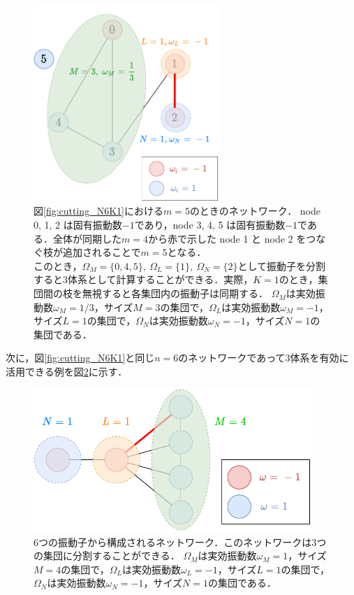 \documentclass[../main]{subfiles}
\begin{document}
\begin{figure}[tbp]
\centering
\includegraphics[width=70mm]{images/cutting_N6_drawio.pdf}
\centering
\caption{図\ref{fig:cutting_N6K1}における$m=5$のときのネットワーク．
node 0, 1, 2 は固有振動数$-1$であり，node 3, 4, 5 は固有振動数$-1$である．全体が同期した$m=4$から赤で示した node 1 と node 2 をつなぐ枝が追加されることで$m=5$となる．\\
このとき，$\Omega_M=\{0,4,5\},\ \Omega_L=\{1\},\ \Omega_N=\{2\}$として振動子を分割すると3体系として計算することができる．実際，$K=1$のとき，集団間の枝を無視すると各集団内の振動子は同期する．
$\Omega_M$は実効振動数$\omega_M=1/3$，サイズ$M=3$の集団で，$\Omega_L$は実効振動数$\omega_M=-1$，サイズ$L=1$の集団で，$\Omega_N$は実効振動数$\omega_N=-1$，サイズ$N=1$の集団である．}
\label{fig:cutting_N6-m5}
\end{figure}

次に，図\ref{fig:cutting_N6K1}と同じ$n=6$のネットワークであって3体系を有効に活用できる例を図\ref{fig:3body-application}に示す．

\begin{figure}[tbp]
    \centering
    \includegraphics[width=105mm]{images/three-body-application.pdf}
    \centering
    \caption{6つの振動子から構成されるネットワーク．このネットワークは3つの集団に分割することができる．
    $\Omega_M$は実効振動数$\omega_M=1$，サイズ$M=4$の集団で，$\Omega_L$は実効振動数$\omega_L=-1$，サイズ$L=1$の集団で，$\Omega_N$は実効振動数$\omega_N=-1$，サイズ$N=1$の集団である．}
    \label{fig:3body-application}
\end{figure}
\end{document}
